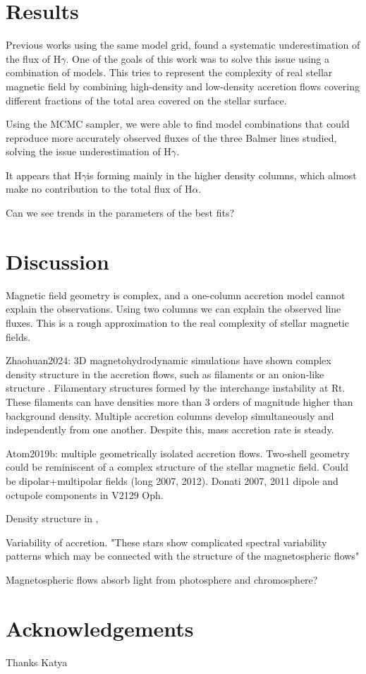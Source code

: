 \documentclass[twocolumn,linenumbers]{aastex631}
\newcommand{\halpha}{H$\alpha$}
\newcommand{\hgamma}{H$\gamma$}
\begin{document}
\section{Results}

Previous works using the same model grid, found a systematic underestimation of the flux of \hgamma. One of the goals of this work was to solve this issue using a combination of models. This tries to represent the complexity of real stellar magnetic field by combining high-density and low-density accretion flows covering different fractions of the total area covered on the stellar surface.

Using the MCMC sampler, we were able to find model combinations that could reproduce more accurately observed fluxes of the three Balmer lines studied, solving the issue underestimation of \hgamma.

It appears that \hgamma is forming mainly in the higher density columns, which almost make no contribution to the total flux of \halpha. 

Can we see trends in the parameters of the best fits?

\section{Discussion} \label{Discussion}

Magnetic field geometry is complex, and a one-column accretion model cannot explain the observations. Using two columns we can explain the observed line fluxes. This is a rough approximation to the real complexity of stellar magnetic fields.

Zhaohuan2024: 3D magnetohydrodynamic simulations have shown complex density structure in the accretion flows, such as filaments or an onion-like structure \citep{zhaohuan2024}. Filamentary structures formed by the interchange instability at Rt. These filaments can have densities more than 3 orders of magnitude higher than background density. Multiple accretion columns develop simultaneously and independently from one another. Despite this, mass accretion rate is steady.

Atom2019b: multiple geometrically isolated accretion flows. Two-shell geometry could be reminiscent of a complex structure of the stellar magnetic field. Could be dipolar+multipolar fields (long 2007, 2012). Donati 2007, 2011 dipole and octupole components in V2129 Oph.

Density structure in \citet{zhaohuan2024}, \citet{espaillat2021}

Variability of accretion. "These stars show complicated spectral variability patterns which may be connected with the structure of the magnetospheric flows" \citep{romanova2003}

Magnetospheric flows absorb light from photosphere and chromosphere? \citep{atom2023}

\section*{Acknowledgements}

Thanks Katya


{}

\end{document}
